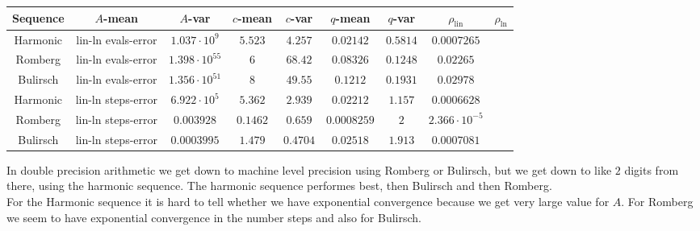 \begin{table}[H]
    \centering
    \small
    \begin{tabular}{c||c|c|c|c|c|c|c|c}
Sequence & \(A\)-mean & \(A\)-var & \(c\)-mean & \(c\)-var & \(q\)-mean & \(q\)-var & \(\rho_{\operatorname{lin}}\) & \(\rho_{\ln}\)\\\hline
\rowcolor{yellow}
Harmonic & lin-ln evals-error & \(1.037\cdot 10^9\) & \(5.523\) & \(4.257\) & \(0.02142\) & \(0.5814\) & \(0.0007265\) \\
\rowcolor{red}
Romberg & lin-ln evals-error & \(1.398\cdot 10^{55}\) & \(6\) & \(68.42\) & \(0.08326\) & \(0.1248\) & \(0.02265\) \\
\rowcolor{red}
Bulirsch & lin-ln evals-error & \(1.356\cdot 10^{51}\) & \(8\) & \(49.55\) & \(0.1212\) & \(0.1931\) & \(0.02978\) \\
\rowcolor{yellow}
Harmonic & lin-ln steps-error & \(6.922\cdot 10^5\) & \(5.362\) & \(2.939\) & \(0.02212\) & \(1.157\) & \(0.0006628\) \\
\rowcolor{green}
Romberg & lin-ln steps-error & \(0.003928\) & \(0.1462\) & \(0.659\) & \(0.0008259\) & \(2\) & \(2.366\cdot 10^{-5}\) \\
\rowcolor{green}
Bulirsch & lin-ln steps-error & \(0.0003995\) & \(1.479\) & \(0.4704\) & \(0.02518\) & \(1.913\) & \(0.0007081\) \\
    \end{tabular}
    \label{tab:my_label}
\end{table}

In double precision arithmetic we get down to machine level precision using Romberg or Bulirsch, but we get down to like \(2\) digits from there, using the harmonic sequence. The harmonic sequence performes best, then Bulirsch and then Romberg.\\

For the Harmonic sequence it is hard to tell whether we have exponential convergence because we get very large value for \(A\). For Romberg we seem to have exponential convergence in the number steps and also for Bulirsch.
